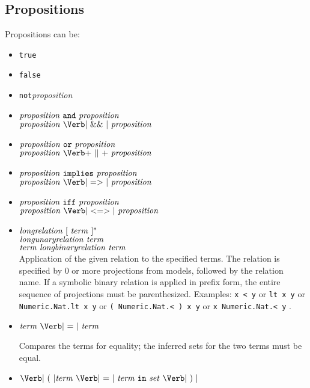 \documentclass{article}
\newcommand{\keywd}[1]{\mbox{\texttt{#1}}\xspace}
\newcommand{\AND}{\keywd{and}}
\newcommand{\FALSE}{\keywd{false}}
\newcommand{\IFF}{\keywd{iff}}
\newcommand{\IMPLY}{\keywd{implies}}
\newcommand{\IN}{\keywd{in}}
\newcommand{\NOT}{\keywd{not}}
\newcommand{\OR}{\keywd{or}}
\newcommand{\TRUE}{\keywd{true}}
\newcommand{\metav}[1]{\mbox{\textit{#1}}\xspace}
\newcommand{\Setexp}{\metav{set}}
\newcommand{\Proposition}{\metav{proposition}}
\newcommand{\Term}{\metav{term}}
\newcommand{\AAND}{\mbox{\Verb| \&\& |}}
\newcommand{\EQUALS}{\mbox{\Verb| = |}}
\newcommand{\IIFF}{\mbox{\Verb| <=> |}}
\newcommand{\IIMPLY}{\mbox{\Verb| => |}}
\newcommand{\LPAREN}{\mbox{\Verb| ( |}}
\newcommand{\OOR}{\mbox{\Verb+ || +}}
\newcommand{\RPAREN}{\mbox{\Verb| ) |}}
\begin{document}
\subsection{Propositions}

Propositions can be:

\begin{itemize}
\item \TRUE

\item \FALSE

\item \NOT \Proposition

\item $\Proposition\ \AND\ \Proposition$\\
      $\Proposition\ \AAND\ \Proposition$

\item $\Proposition\ \OR\ \Proposition$\\
      $\Proposition\ \OOR\ \Proposition$

\item $\Proposition\ \IMPLY\ \Proposition$\\
      $\Proposition\ \IIMPLY\ \Proposition$

\item $\Proposition\ \IFF\ \Proposition$\\
      $\Proposition\ \IIFF\ \Proposition$

\item $\metav{longrelation}\ [\ \Term\ ]^*$\\
      $\metav{longunaryrelation}\ \Term$\\
      $\Term\ \metav{longbinaryrelation}\ \Term$\\
     
      
      Application of the given relation to the specified terms.  The
      relation is specified by 0 or more projections from models,
      followed by the relation name.  If a symbolic binary relation
      is applied in prefix form, the entire sequence of projections
      must be parenthesized. 
      Examples: \Verb|x < y| or \Verb|lt x y| or \Verb|Numeric.Nat.lt x y| or
      \Verb|( Numeric.Nat.< ) x y| or \Verb|x Numeric.Nat.< y| .

\item $\Term\ \EQUALS\ \Term$

   Compares the terms for equality; the inferred sets for the two terms
   must be equal.

\item $\LPAREN \Term\ \EQUALS\ \Term\ \IN\ \Setexp\ \RPAREN$


\end{itemize}
\end{document}
